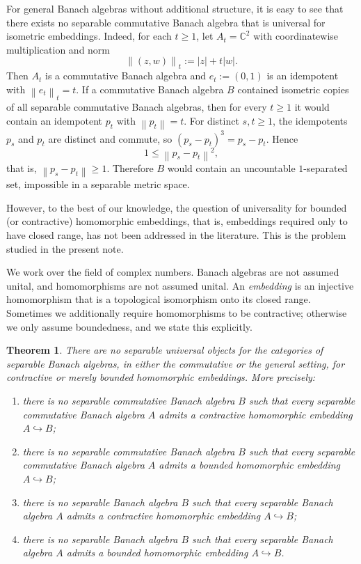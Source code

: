\documentclass[11pt]{amsart}
\newcommand{\C}{\mathbb{C}}
\newcommand{\norm}[1]{\left\lVert #1\right\rVert}
\renewcommand{\le}{\leqslant}
\renewcommand{\ge}{\geqslant}
\theoremstyle{plain}
\newtheorem{theorem}{Theorem}[section]
\theoremstyle{remark}
\numberwithin{equation}{section}
\begin{document}
For general Banach algebras without additional structure, it is easy to see that there exists no separable commutative Banach algebra that is universal for isometric embeddings. Indeed, for each $t\ge 1$, let $A_t=\C^2$ with coordinatewise multiplication and norm
\[
\norm{(z,w)}_t := |z|+t|w|.
\]
Then $A_t$ is a commutative Banach algebra and $e_t:=(0,1)$ is an idempotent with $\norm{e_t}_t=t$. If a commutative Banach algebra $B$ contained isometric copies of all separable commutative Banach algebras, then for every $t\ge 1$ it would contain an idempotent $p_t$ with $\norm{p_t}=t$. For distinct $s,t\ge 1$, the idempotents $p_s$ and $p_t$ are distinct and commute, so $(p_s-p_t)^3=p_s-p_t$. Hence
\[
1\le \norm{p_s-p_t}^2,
\]
that is, $\norm{p_s-p_t}\ge 1$. Therefore $B$ would contain an uncountable $1$-separated set, impossible in a separable metric space.

However, to the best of our knowledge, the question of universality for bounded (or contractive) homomorphic embeddings, that is, embeddings required only to have closed range, has not been addressed in the literature. This is the problem studied in the present note.

We work over the field of complex numbers. Banach algebras are not assumed unital, and homomorphisms are not assumed unital. An \emph{embedding} is an injective homomorphism that is a topological isomorphism onto its closed range. Sometimes we additionally require homomorphisms to be contractive; otherwise we only assume boundedness, and we state this explicitly.

\begin{theorem}\label{thm:main}
There are no separable universal objects for the categories of separable Banach algebras, in either the commutative or the general setting, for contractive or merely bounded homomorphic embeddings. More precisely:
\begin{enumerate}
    \item[(A)] there is no separable \emph{commutative} Banach algebra $B$ such that every separable \emph{commutative} Banach algebra $A$ admits a \emph{contractive} homomorphic embedding $A\hookrightarrow B$;
    \item[(B)] there is no separable \emph{commutative} Banach algebra $B$ such that every separable \emph{commutative} Banach algebra $A$ admits a bounded homomorphic embedding $A\hookrightarrow B$;
    \item[(C)] there is no separable Banach algebra $B$ such that every separable Banach algebra $A$ admits a \emph{contractive} homomorphic embedding $A\hookrightarrow B$;
    \item[(D)] there is no separable Banach algebra $B$ such that every separable Banach algebra $A$ admits a bounded homomorphic embedding $A\hookrightarrow B$.
\end{enumerate}
\end{theorem}
\end{document}

